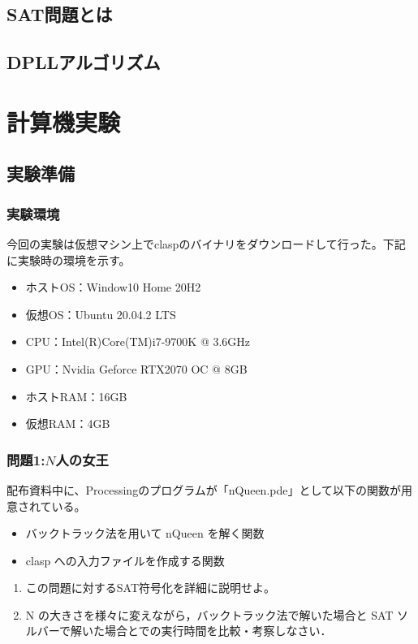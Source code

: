 \documentclass[dvipdfmx]{jsarticle}
\begin{document}
\subsection{SAT問題とは}
\subsection{DPLLアルゴリズム}
\section{計算機実験}
\subsection{実験準備}
  \subsubsection{実験環境}
  今回の実験は仮想マシン上でclaspのバイナリをダウンロードして行った。下記に実験時の環境を示す。
  \begin{itemize}
    \item ホストOS：Window10 Home 20H2
    \item 仮想OS：Ubuntu 20.04.2 LTS
    \item CPU：Intel(R)Core(TM)i7-9700K @ 3.6GHz
    \item GPU：Nvidia Geforce RTX2070 OC @ 8GB
    \item ホストRAM：16GB
    \item 仮想RAM：4GB
  \end{itemize}
\subsubsection{問題1:$N$人の女王}
配布資料中に、Processingのプログラムが「nQueen.pde」として以下の関数が用意されている。
\begin{itemize}
  \item バックトラック法を用いて nQueen を解く関数
  \item clasp への入力ファイルを作成する関数
\end{itemize}
\begin{enumerate}
  \item この問題に対するSAT符号化を詳細に説明せよ。
  \item N の大きさを様々に変えながら，バックトラック法で解いた場合と SAT ソルバーで解いた場合とでの実行時間を比較・考察しなさい．
\end{enumerate}
\end{document}
